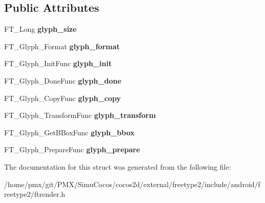 \subsection*{Public Attributes}
\begin{DoxyCompactItemize}
\item 
\mbox{\label{structFT__Glyph__Class___a1a76c68b9fb0e93947e888c0fe77cbf8}} 
F\+T\+\_\+\+Long {\bfseries glyph\+\_\+size}
\item 
\mbox{\label{structFT__Glyph__Class___a26738bd14d5845e18d09ccaa3a709d23}} 
F\+T\+\_\+\+Glyph\+\_\+\+Format {\bfseries glyph\+\_\+format}
\item 
\mbox{\label{structFT__Glyph__Class___a657200ad15ff061b38fb25b168737f95}} 
F\+T\+\_\+\+Glyph\+\_\+\+Init\+Func {\bfseries glyph\+\_\+init}
\item 
\mbox{\label{structFT__Glyph__Class___aabf05a4368dccacf45e1a54e542e5d63}} 
F\+T\+\_\+\+Glyph\+\_\+\+Done\+Func {\bfseries glyph\+\_\+done}
\item 
\mbox{\label{structFT__Glyph__Class___afc78dcdc4802760ebcaccf3a7b6cd088}} 
F\+T\+\_\+\+Glyph\+\_\+\+Copy\+Func {\bfseries glyph\+\_\+copy}
\item 
\mbox{\label{structFT__Glyph__Class___a5f72ac1d0d92eb31fa3e2bb721a97ef2}} 
F\+T\+\_\+\+Glyph\+\_\+\+Transform\+Func {\bfseries glyph\+\_\+transform}
\item 
\mbox{\label{structFT__Glyph__Class___a06bfad431865c6731305cb781f78b317}} 
F\+T\+\_\+\+Glyph\+\_\+\+Get\+B\+Box\+Func {\bfseries glyph\+\_\+bbox}
\item 
\mbox{\label{structFT__Glyph__Class___af7f406e5ea20a6614c946746938830c9}} 
F\+T\+\_\+\+Glyph\+\_\+\+Prepare\+Func {\bfseries glyph\+\_\+prepare}
\end{DoxyCompactItemize}


The documentation for this struct was generated from the following file\+:\begin{DoxyCompactItemize}
\item 
/home/pmx/git/\+P\+M\+X/\+Simu\+Cocos/cocos2d/external/freetype2/include/android/freetype2/ftrender.\+h\end{DoxyCompactItemize}
